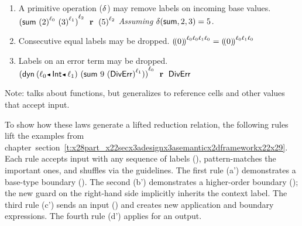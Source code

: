 \documentclass[ twoside,open=right,titlepage,numbers=noenddot,headinclude,%
                footinclude=true,cleardoublepage=empty,abstract=off,
                BCOR=5mm,paper=a4,fontsize=11pt,%
                ngerman,american,%
                parts,pdfspacing]{scrreprt}
\newcommand{\SecRef}[2]{section~#1}
\newcommand{\SecRefLocal}[3]{\hyperref[#1]{\SecRef{#2}{#3}}}
\renewcommand{\SecRefLocal}[3]{section~\ref{#1}}
\begin{document}
{{\begin{enumerate}
    \item \label{law:new}
      A primitive operation ($\delta$) may remove labels on incoming base values.
    \subitem\hfill
      ${( \mathsf{sum}~{{( 2 )}^{\ell_0}}~{{( 3 )}^{\ell_1}} )}^{\ell_2}
       \mathrel{~{\textbf{r}}~} {( 5 )}^{\ell_2}$
    \subitem\hfill
      \emph{Assuming\/ $\delta(\mathsf{sum}, 2, 3) = 5$.}

    \item \label{law:dup}
      Consecutive equal labels may be dropped.
    \subitem\hfill
      ${(\!( 0)\!)}^{\ell_0  \ell_0  \ell_1  \ell_0} = {(\!( 0)\!)}^{\ell_0  \ell_1  \ell_0}$

    \item \label{law:error}
      Labels on an error term may be dropped.
    \subitem\hfill
      $\obars{\edynb{\obnd{\sowner_0}{\tint}{\sowner_1}}{(\ssum~{9}~{\obars{\divisionbyzeroerror}{\sowner_1}})}}{\sowner_0}
       \samplerrarrow \divisionbyzeroerror$

  \end{enumerate}}}

\noindent{}Note:  talks about functions, but generalizes to
 reference cells and other values that accept input.

To show how these laws generate a lifted reduction relation,
 the following rules lift the examples from chapter~\SecRefLocal{t:x28part_x22secx3adesignx3asemanticx2dframeworkx22x29}{4.4.2}{Semantic Framework}.
Each rule accepts input with any sequence of labels (\relax{$\sownerlist$}),
 pattern{-}matches the important ones, and shuffles via the guidelines.
The first rule (a{'}) demonstrates a base{-}type boundary ().
The second (b{'}) demonstrates a higher{-}order boundary (); the
 new guard on the right{-}hand side implicitly inherits the context label.
The third rule (c{'}) sends an input () and creates new application
 and boundary expressions.
The fourth rule (d{'}) applies  for an output.


\end{document}
